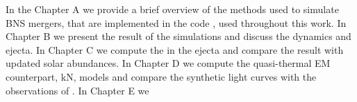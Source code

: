 In the Chapter A we provide a brief overview of the methods used to simulate \ac{BNS} mergers, 
that are implemented in the code \wisky{}, used throughout this work.
In Chapter B we present the result of the simulations and discuss the dynamics and ejecta.
In Chapter C we compute the \rproc{} \nuc{} in the ejecta and compare the result with updated 
solar abundances.
In Chapter D we compute the quasi-thermal \ac{EM} counterpart, \ac{kN}, models and compare 
the synthetic light curves with the observations of \AT{}.
In Chapter E we 